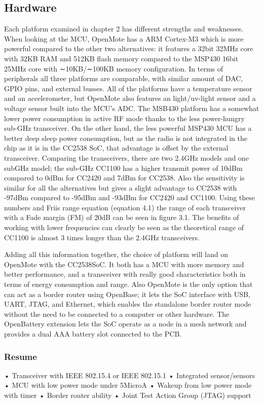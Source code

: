 \subsection{Hardware}
Each platform examined in chapter 2 has different strengths and weaknesses.
When looking at the MCU,
	OpenMote has a ARM Cortex-M3 which is more powerful compared to the other two alternatives:
	it features a 32bit 32MHz core with 32KB RAM and 512KB flash memory compared to the MSP430 16bit 25MHz core with ∼10KB/∼100KB memory configuration.
In terms of peripherals all three platforms are comparable,
	with similar amount of DAC,
	GPIO pins,
	and external busses.
All of the platforms have a temperature sensor and an accelerometer,
	but OpenMote also features an light/uv-light sensor and a voltage sensor built into the MCU’s ADC.
The MSB430 platform has a somewhat lower power consumption in active RF mode thanks to the less power-hungry sub-GHz transceiver.
On the other hand,
	the less powerful MSP430 MCU has a better deep sleep power consumption,
	but as the radio is not integrated in the chip as it is in the CC2538 SoC,
	that advantage is offset by the external transceiver.
Comparing the transceivers,
	there are two 2.4GHz models and one subGHz model;
	the sub-GHz CC1100 has a higher transmit power of 10dBm compared to 0dBm for CC2420 and 7dBm for CC2538.
Also the sensitivity is similar for all the alternatives but gives a slight advantage to CC2538 with -97dBm compared to -95dBm and -93dBm for CC2420 and CC1100.
Using these numbers and Friis range equation (equation 4.1) the range of each transceiver with a Fade margin (FM) of 20dB can be seen in figure 3.1.
The benefits of working with lower frequencies can clearly be seen as the theoretical range of CC1100 is almost 3 times longer than the 2.4GHz transceivers.

Adding all this information together,
	the choice of platform will land on OpenMote with the CC2538SoC.
It both has a MCU with more memory and better performance,
	and a transceiver with really good characteristics both in terms of energy consumption and range.
Also OpenMote is the only option that can act as a border router using OpenBase;
	it lets the SoC interface with USB,
	UART,
	JTAG,
	and Ethernet,
	which enables the standalone border router mode without the need to be connected to a computer or other hardware.
The OpenBattery extension lets the SoC operate as a node in a mesh network and provides a dual AAA battery slot connected to the PCB.

\subsubsection*{Resume}
• Transceiver with IEEE 802.15.4 or IEEE 802.15.1
• Integrated sensor/sensors
• MCU with low power mode under 5MicroA
• Wakeup from low power mode with timer
• Border router ability
• Joint Test Action Group (JTAG) support

